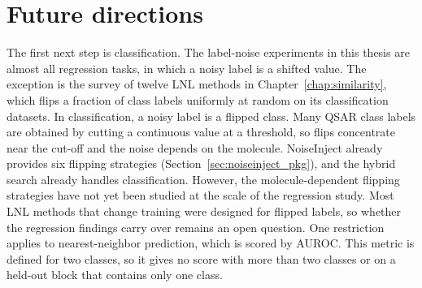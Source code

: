 \section{Future directions}

The first next step is classification. The label-noise experiments in this thesis are almost all regression tasks, in which a noisy label is a shifted value. The exception is the survey of twelve LNL methods in Chapter~\ref{chap:similarity}, which flips a fraction of class labels uniformly at random on its classification datasets. In classification, a noisy label is a flipped class. Many QSAR class labels are obtained by cutting a continuous value at a threshold, so flips concentrate near the cut-off and the noise depends on the molecule. NoiseInject already provides six flipping strategies (Section~\ref{sec:noiseinject_pkg}), and the hybrid search already handles classification. However, the molecule-dependent flipping strategies have not yet been studied at the scale of the regression study. Most LNL methods that change training were designed for flipped labels, so whether the regression findings carry over remains an open question. One restriction applies to nearest-neighbor prediction, which is scored by AUROC. This metric is defined for two classes, so it gives no score with more than two classes or on a held-out block that contains only one class.

